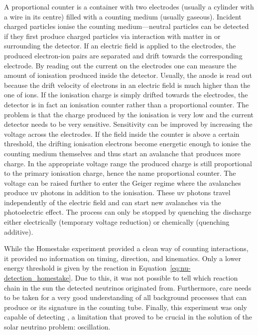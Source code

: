 A proportional counter is a container with two electrodes (usually a cylinder with a wire in its centre) filled with a counting medium (usually gaseous).
Incident charged particles ionise the counting medium---neutral particles can be detected if they first produce charged particles via interaction with matter in or surrounding the detector.
If an electric field is applied to the electrodes, the produced electron-ion pairs are separated and drift towards the corresponding electrode.
By reading out the current on the electrodes one can measure the amount of ionisation produced inside the detector.
Usually, the anode is read out because the drift velocity of electrons in an electric field is much higher than the one of ions.
If the ionisation charge is simply drifted towards the electrodes, the detector is in fact an ionisation counter rather than a proportional counter.
The problem is that the charge produced by the ionisation is very low and the current detector needs to be very sensitive.
Sensitivity can be improved by increasing the voltage across the electrodes.
If the field inside the counter is above a certain threshold, the drifting ionisation electrons become energetic enough to ionise the counting medium themselves and thus start an avalanche that produces more charge.
In the appropriate voltage range the produced charge is still proportional to the primary ionisation charge, hence the name proportional counter.
The voltage can be raised further to enter the Geiger regime where the avalanches produce \gls{uv} photons in addition to the ionisation.
These \gls{uv} photons travel independently of the electric field and can start new avalanches via the photoelectric effect.
The process can only be stopped by quenching the discharge either electrically (temporary voltage reduction) or chemically (quenching additive).

While the Homestake experiment provided a clean way of counting \Pgne interactions, it provided no information on timing, direction, and kinematics.
Only a lower energy threshold is given by the reaction in Equation~\eqref{eq:nu-detection_homestake}.
Due to this, it was not possible to tell which reaction chain in the sun the detected neutrinos originated from.
Furthermore, care needs to be taken for a very good understanding of all background processes that can produce  or its signature in the counting tube.
Finally, this experiment was only capable of detecting \Pgne, a limitation that proved to be crucial in the solution of the solar neutrino problem: oscillation.

